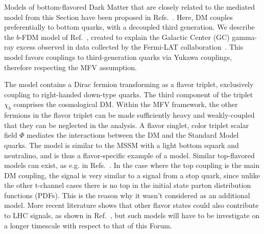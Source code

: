 Models of bottom-flavored Dark Matter that are closely related to the \tchannel mediated model from this 
Section have been proposed in Refs.~\cite{Lin:2013sca,Agrawal:2014una}. 
Here, DM couples preferentially to bottom quarks, with a decoupled third generation. 
We describe the $b$-FDM model of Ref.~\cite{Agrawal:2014una}, created to explain the Galactic Center (GC) 
gamma-ray excess observed in data collected by the Fermi-LAT collaboration~\cite{Daylan:2014rsa,Calore:2014xka}. 
This model favors couplings to third-generation quarks via Yukawa couplings, 
therefore respecting the MFV assumption. 


The model contains a Dirac fermion transforming as a flavor triplet, exclusively coupling
to right-handed down-type quarks. The third component of the triplet $\chi_b$ comprises the 
cosmological DM. Within the MFV framework, the other fermions in the flavor triplet can be 
made sufficiently heavy and weakly-coupled that they can be neglected in the analysis.
A flavor singlet, color triplet scalar field $\Phi$ mediates the interactions between the DM 
and the Standard Model quarks.  The model is similar to the MSSM with a light bottom squark and neutralino, 
and is thus a flavor-specific example of a \tchannel model. 
Similar top-flavored models can exist, as e.g. in Refs.~\cite{Kumar:2013hfa,Batell:2013zwa}. 
In the case where the top coupling is the main DM coupling, 
the signal is very similar to a signal from a stop quark, since unlike the other t-channel cases there is no top
in the initial state parton distribution functions (PDFs). This is the reason why it wasn't considered as an additional model. More recent
literature shows that other flavor states could also contribute to LHC signals, as shown in Ref.~\cite{Kilic:2015vka},
but such models will have to be investigate on a longer timescale with respect to that of this Forum. 

